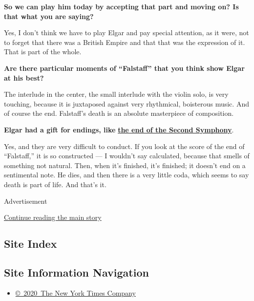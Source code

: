 \textbf{So we can play him today by accepting that part and moving on?
Is that what you are saying?}

Yes, I don't think we have to play Elgar and pay special attention, as
it were, not to forget that there was a British Empire and that that was
the expression of it. That is part of the whole.

\textbf{Are there particular moments of ``Falstaff'' that you think show
Elgar at his best?}

The interlude in the center, the small interlude with the violin solo,
is very touching, because it is juxtaposed against very rhythmical,
boisterous music. And of course the end. Falstaff's death is an absolute
masterpiece of composition.

\textbf{Elgar had a gift for endings, like}
\textbf{\href{https://youtu.be/5yi2db0ZLg8?list=OLAK5uy_lsUCoQUQ9CuUbQVq1nGW6irUbtDjfIs0c\&t=657}{the
end of the Second Symphony}}.

Yes, and they are very difficult to conduct. If you look at the score of
the end of ``Falstaff,'' it is so constructed --- I wouldn't say
calculated, because that smells of something not natural. Then, when
it's finished, it's finished; it doesn't end on a sentimental note. He
dies, and then there is a very little coda, which seems to say death is
part of life. And that's it.

Advertisement

\protect\hyperlink{after-bottom}{Continue reading the main story}

\hypertarget{site-index}{%
\subsection{Site Index}\label{site-index}}

\hypertarget{site-information-navigation}{%
\subsection{Site Information
Navigation}\label{site-information-navigation}}

\begin{itemize}
\tightlist
\item
  \href{https://help.nytimes3xbfgragh.onion/hc/en-us/articles/115014792127-Copyright-notice}{©~2020~The
  New York Times Company}
\end{itemize}

